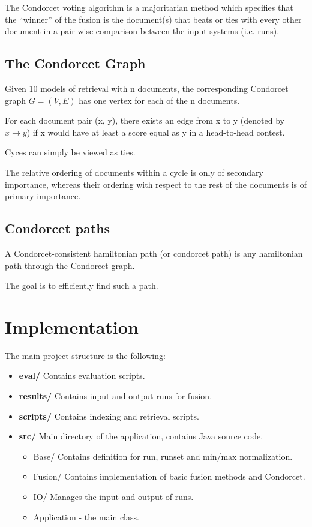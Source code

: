     The Condorcet voting algorithm is a majoritarian method which specifies
    that the ``winner'' of the fusion is the document(s) that beats or ties
    with every other document in a pair-wise comparison between the input
    systems (i.e. runs).

	\subsection{The Condorcet Graph}

	Given 10 models of retrieval with n documents, the corresponding
	Condorcet graph $G = (V, E)$ has one vertex for each of the n documents.

	For each document pair (x, y), there exists an edge from x to
	y (denoted by $x \rightarrow y$) if x would have at least a score
    equal as y in a head-to-head contest.

	Cyces can simply be viewed as ties.

	The relative ordering of documents within a cycle is only of
	secondary importance, whereas their ordering with respect
	to the rest of the documents is of primary importance.

	\subsection{Condorcet paths}

	A Condorcet-consistent hamiltonian path (or condorcet path) is any
	hamiltonian path through the Condorcet graph.

	The goal is to efficiently find such a path.

    \section{Implementation}

	The main project structure is the following:
	
	\begin{itemize}
	\item \textbf{eval/} Contains evaluation scripts.
	\item \textbf{results/} Contains input and output runs for fusion.
	\item \textbf{scripts/} Contains indexing and retrieval scripts.
	\item \textbf{src/} Main directory of the application, contains Java source code.
		\begin{itemize}
		\item Base/ Contains definition for run, runset and min/max normalization.
		\item Fusion/ Contains implementation of basic fusion methods and Condorcet.
		\item IO/ Manages the input and output of runs.
		\item Application - the main class.
		\end{itemize}
	\end{itemize}

